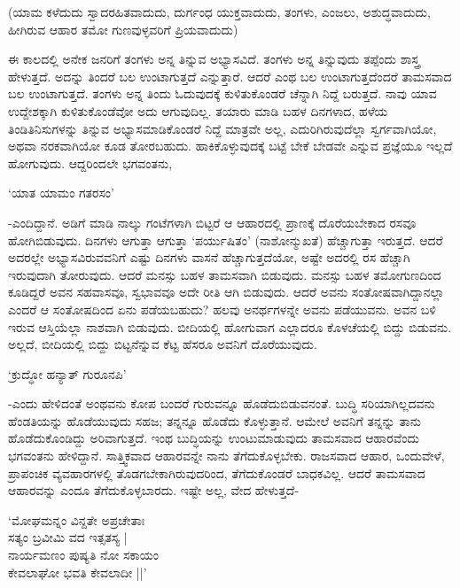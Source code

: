 (ಯಾಮ ಕಳೆದುದು ಸ್ವಾದರಹಿತವಾದುದು, ದುರ್ಗಂಧ ಯುಕ್ತವಾದುದು, ತಂಗಳು, ಎಂಜಲು, ಅಶುದ್ಧವಾದುದು, ಹೀಗಿರುವ ಆಹಾರ ತಮೋ ಗುಣವುಳ್ಳವರಿಗೆ ಪ್ರಿಯವಾದುದು)

ಈ ಕಾಲದಲ್ಲಿ ಅನೇಕ ಜನರಿಗೆ ತಂಗಳು ಅನ್ನ ತಿನ್ನುವ ಅಭ್ಯಾಸವಿದೆ. ತಂಗಳು ಅನ್ನ ತಿನ್ನುವುದು ತಪ್ಪೆಂದು ಶಾಸ್ತ್ರ ಹೇಳುತ್ತದೆ. ಅದನ್ನು ತಿಂದರೆ ಬಲ ಉಂಟಾಗುತ್ತದೆ ಎನ್ನುತ್ತಾರೆ. ಆದರೆ ಎಂಥ ಬಲ ಉಂಟಾಗುತ್ತದೆಂದರೆ ತಾಮಸವಾದ ಬಲ ಉಂಟಾಗುತ್ತದೆ. ತಂಗಳು ಅನ್ನ ತಿಂದು ಓದುವುದಕ್ಕೆ ಕುಳಿತುಕೊಂಡರೆ ಚೆನ್ನಾಗಿ ನಿದ್ದೆ ಬರುತ್ತದೆ. ನಾವು ಯಾವ ಉದ್ದೇಶಕ್ಕಾಗಿ ಕುಳಿತುಕೊಂಡೆವೋ ಅದು ಆಗುವುದಿಲ್ಲ. ತಯಾರು ಮಾಡಿ ಬಹಳ ದಿನಗಳಾದ, ಹಳೆಯ ತಿಂಡಿತಿನಿಸುಗಳನ್ನು ತಿನ್ನುವ ಅಭ್ಯಾಸಮಾಡಿಕೊಂಡರೆ ನಿದ್ದೆ ಮಾತ್ರವೇ ಅಲ್ಲ, ಎದುರಿಗಿರುವುದೆಲ್ಲಾ ಸ್ವರ್ಗವಾಗಿಯೋ, ಅಥವಾ ನರಕವಾಗಿಯೋ ಕೂಡ ತೋರಬಹುದು. ಹಾಕಿಕೊಳ್ಳುವುದಕ್ಕೆ ಬಟ್ಟೆ ಬೇಕೆ ಬೇಡವೇ ಎನ್ನುವ ಪ್ರಜ್ಞೆಯೂ ಇಲ್ಲದೆ ಹೋಗುವುದು. ಆದ್ದರಿಂದಲೇ ಭಗವಂತನು,

\begin{shloka}
`ಯಾತ ಯಾಮಂ ಗತರಸಂ'
\end{shloka}


-ಎಂದಿದ್ದಾನೆ. ಅಡಿಗೆ ಮಾಡಿ ನಾಲ್ಕು ಗಂಟೆಗಳಾಗಿ ಬಿಟ್ಟರೆ ಆ ಆಹಾರದಲ್ಲಿ ಪ್ರಾಣಕ್ಕೆ ದೊರೆಯಬೇಕಾದ ರಸವೂ ಹೋಗಿಬಿಡುವುದು. ದಿನಗಳು ಆಗುತ್ತಾ ಆಗುತ್ತಾ `ಪರ್ಯುಷಿತಂ' (ನಾಶೋನ್ಮುಖತೆ) ಹೆಚ್ಚಾಗುತ್ತಾ ಇರುತ್ತದೆ. ಆದರೆ ಅದರಲ್ಲೇ ಅಭ್ಯಾಸವಿರುವವನಿಗೆ ಎಷ್ಟು ದಿನಗಳು ವಾಸನೆ ಹೆಚ್ಚಾಗುತ್ತದೆಯೋ, ಅಷ್ಟೇ ಅದರಲ್ಲಿ ರಸ ಹೆಚ್ಚಾಗಿ ಇರುವುದಾಗಿ ತೋರುವುದು. ಆದರೆ ಮನಸ್ಸು ಬಹಳ ತಾಮಸವಾಗಿ ಬಿಡುವುದು. ಮನಸ್ಸು ಬಹಳ ತಮೋಗುಣದಿಂದ ಕೂಡಿದ್ದರೆ ಅವನ ಸಹವಾಸವೂ, ಸ್ವಭಾವವೂ ಅದೇ ರೀತಿ ಆಗಿ ಬಿಡುವುದು. ಆದರೆ ಅವನು ಸಂತೋಷವಾಗಿದ್ದಾನಲ್ಲಾ ಎಂದರೆ ಆ ಸಂತೋಷದಿಂದ ಏನು ಪಡೆಯಬಹುದು? ಹಲವು ಅನರ್ಥಗಳನ್ನೇ ಅವನು ಪಡೆಯುವನು. ಅವನ ಬಳಿ ಇರುವ ಆಸ್ತಿಯೆಲ್ಲಾ ನಾಶವಾಗಿ ಬಿಡುವುದು. ಬೀದಿಯಲ್ಲಿ ಹೋಗುವಾಗ ಎಲ್ಲಾದರೂ ಕೊಳಚೆಯಲ್ಲಿ ಬಿದ್ದು ಬಿಡುವನು. ಅಲ್ಲದೆ, ಬೀದಿಯಲ್ಲಿ ಬಿದ್ದು ಬಿಟ್ಟನೆನ್ನುವ ಕೆಟ್ಟ ಹೆಸರೂ ಅವನಿಗೆ ದೊರೆಯುವುದು.

\begin{shloka}
`ಕ್ರುದ್ಧೋ ಹನ್ಯಾತ್ ಗುರೂನಪಿ'
\end{shloka}

-ಎಂದು ಹೇಳಿದಂತೆ ಅಂಥವನು ಕೋಪ ಬಂದರೆ ಗುರುವನ್ನೂ ಹೊಡೆದುಬಿಡುವನಂತೆ. ಬುದ್ಧಿ ಸರಿಯಾಗಿಲ್ಲದವನು ಹೆಂಡತಿಯನ್ನು ಹೊಡೆಯುವುದು ಸಹಜ; ತನ್ನನ್ನೂ ಹೊಡೆದು ಕೊಳ್ಳುತ್ತಾನೆ. ಆಮೇಲೆ ಅವನಿಗೆ ತನ್ನನ್ನು ತಾನು ಹೊಡೆದುಕೊಂಡಿದ್ದು ಅರಿವಾಗುತ್ತದೆ. ಇಂಥ ಬುದ್ಧಿಯನ್ನು ಉಂಟುಮಾಡುವುದು ತಾಮಸವಾದ ಆಹಾರವೆಂದು ಭಗವಂತನು ಹೇಳಿದ್ದಾನೆ. ಸಾತ್ತ್ವಿಕವಾದ ಆಹಾರವನ್ನೇ ನಾನು ತೆಗೆದುಕೊಳ್ಳಬೇಕು. ರಾಜಸವಾದ ಆಹಾರ, ಒಂದುವೇಳೆ, ಪ್ರಾಪಂಚಿಕ ವ್ಯವಹಾರಗಳಲ್ಲಿ ತೊಡಗಬೇಕಾಗಿರುವುದರಿಂದ, ತೆಗೆದುಕೊಂಡರೆ ಬಾಧಕವಿಲ್ಲ. ಆದರೆ ತಾಮಸವಾದ ಆಹಾರವನ್ನು ಎಂದೂ ತೆಗೆದುಕೊಳ್ಳಬಾರದು. ಇಷ್ಟೇ ಅಲ್ಲ, ವೇದ ಹೇಳುತ್ತದೆ-

\begin{shloka}
`ಮೋಘಮನ್ನಂ ವಿನ್ದತೇ ಅಪ್ರಚೇತಾಃ\\
ಸತ್ಯಂ ಬ್ರವೀಮಿ ವದ ಇತ್ಸತಸ್ಯ |\\
ನಾರ್ಯಮಣಂ ಪುಷ್ಯತಿ ನೋ ಸಕಾಯಂ\\
ಕೇವಲಾಘೋ ಭವತಿ ಕೇವಲಾದೀ ||'
\end{shloka}

